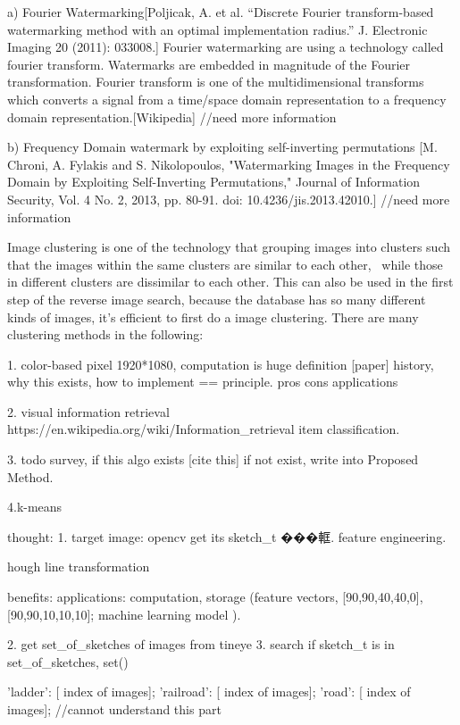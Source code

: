 a) Fourier Watermarking[Poljicak, A. et al. “Discrete Fourier transform-based watermarking method with an optimal implementation radius.” J. Electronic Imaging 20 (2011): 033008.]
Fourier watermarking are using a technology called fourier transform.
Watermarks are embedded in magnitude of the Fourier transformation.
Fourier transform is one of the multidimensional transforms which converts a signal from a time/space domain representation to a frequency domain representation.[Wikipedia]
//need more information


b) Frequency Domain watermark by exploiting self-inverting permutations
[M. Chroni, A. Fylakis and S. Nikolopoulos, "Watermarking Images in the Frequency Domain by Exploiting Self-Inverting Permutations," Journal of Information Security, Vol. 4 No. 2, 2013, pp. 80-91. doi: 10.4236/jis.2013.42010.]
//need more information

Image clustering is one of the technology that grouping images into clusters such that the images within the same clusters are similar to each other, \
while those in different clusters are dissimilar to each other.
This can also be used in the first step of the reverse image search,
because the database has so many different kinds of images,
it's efficient to first do a image clustering.
There are many clustering methods in the following:

1. color-based pixel
1920*1080, computation is huge
definition [paper] \cite{}
history, why this exists, 
how to implement == principle.
pros cons
applications

2. visual information retrieval
https://en.wikipedia.org/wiki/Information_retrieval
item classification.


3. todo survey, if this algo exists [cite this]
if not exist, write into Proposed Method.

4.k-means





thought:
1. target image: opencv get its sketch_t ���軭.  feature engineering.

hough line transformation

benefits:
applications:
computation, storage (feature vectors, [90,90,40,40,0], [90,90,10,10,10];
        machine learning model ).

2. get set_of_sketches of images from tineye
3. search if sketch_t is in set_of_sketches, set()

{
'ladder': [ index of images];
'railroad': [ index of images];
'road': [ index of images];
}
//cannot understand this part
















